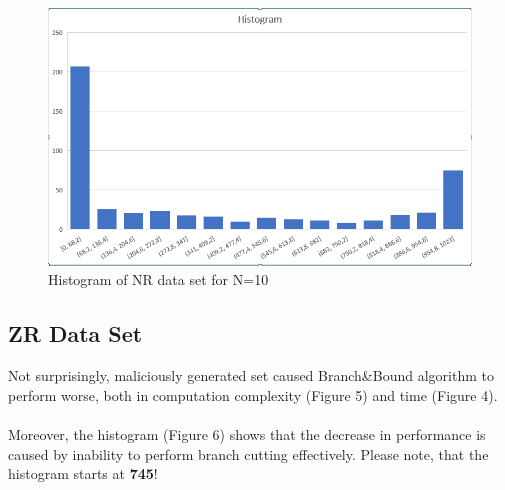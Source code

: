 \documentclass{article}
\begin{document}
\begin{figure}[H]
    \centering
    \includegraphics[width=0.8\linewidth]{NRhistogram.PNG}
    \caption{Histogram of NR data set for N=10 }
\end{figure}

\subsection{ZR Data Set}
Not surprisingly, maliciously generated set caused Branch\&Bound algorithm to perform worse, both in computation complexity (Figure 5) and time (Figure 4).
\\
\\
Moreover, the histogram (Figure 6) shows that the decrease in performance is caused by inability to perform branch cutting effectively. Please note, that the histogram starts at \textbf{745}!
\end{document}

